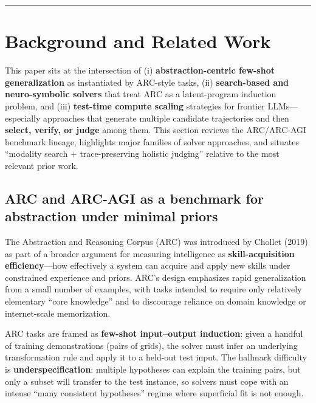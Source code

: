 \documentclass[11pt]{article}
\begin{document}
\begin{center}\rule{0.5\linewidth}{0.5pt}\end{center}

\hypertarget{background-and-related-work}{%
\section{Background and Related
Work}\label{background-and-related-work}}

This paper sits at the intersection of (i) \textbf{abstraction-centric
few-shot generalization} as instantiated by ARC-style tasks, (ii)
\textbf{search-based and neuro-symbolic solvers} that treat ARC as a
latent-program induction problem, and (iii) \textbf{test-time compute
scaling} strategies for frontier LLMs---especially approaches that
generate multiple candidate trajectories and then \textbf{select,
verify, or judge} among them. This section reviews the ARC/ARC-AGI
benchmark lineage, highlights major families of solver approaches, and
situates ``modality search + trace-preserving holistic judging''
relative to the most relevant prior work.

\hypertarget{arc-and-arc-agi-as-a-benchmark-for-abstraction-under-minimal-priors}{%
\subsection{ARC and ARC-AGI as a benchmark for abstraction under minimal
priors}\label{arc-and-arc-agi-as-a-benchmark-for-abstraction-under-minimal-priors}}

The Abstraction and Reasoning Corpus (ARC) was introduced by Chollet
(2019) as part of a broader argument for measuring intelligence as
\textbf{skill-acquisition efficiency}---how effectively a system can
acquire and apply new skills under constrained experience and priors.
ARC's design emphasizes rapid generalization from a small number of
examples, with tasks intended to require only relatively elementary
``core knowledge'' and to discourage reliance on domain knowledge or
internet-scale memorization.

ARC tasks are framed as \textbf{few-shot input--output induction}: given
a handful of training demonstrations (pairs of grids), the solver must
infer an underlying transformation rule and apply it to a held-out test
input. The hallmark difficulty is \textbf{underspecification}: multiple
hypotheses can explain the training pairs, but only a subset will
transfer to the test instance, so solvers must cope with an intense
``many consistent hypotheses'' regime where superficial fit is not
enough.
\end{document}
